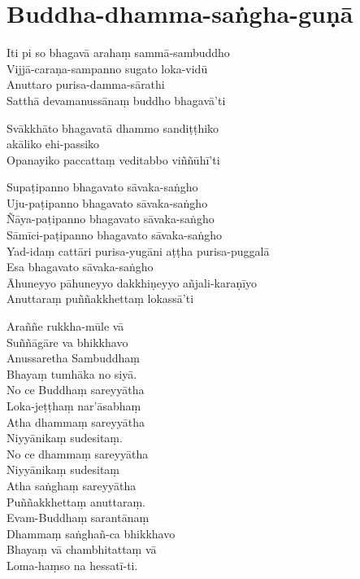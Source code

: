 \section{Buddha-dhamma-saṅgha-guṇā}


\begin{paritta}

Iti pi so bhagavā arahaṃ sammā-sambuddho\\
Vijjā-caraṇa-sampanno sugato loka-vidū\\
Anuttaro purisa-damma-sārathi\\
Satthā devamanussānaṃ buddho bhagavā'ti

Svākkhāto bhagavatā dhammo sandiṭṭhiko\\
\vin akāliko ehi-passiko\\
Opanayiko paccattaṃ veditabbo viññūhī'ti

Supaṭipanno bhagavato sāvaka-saṅgho\\
Uju-paṭipanno bhagavato sāvaka-saṅgho\\
Ñāya-paṭipanno bhagavato sāvaka-saṅgho\\
Sāmīci-paṭipanno bhagavato sāvaka-saṅgho\\
Yad-idaṃ cattāri purisa-yugāni aṭṭha purisa-puggalā\\
Esa bhagavato sāvaka-saṅgho\\
Āhuneyyo pāhuneyyo dakkhiṇeyyo añjali-karaṇīyo\\
Anuttaraṃ puññakkhettaṃ lokassā'ti


\sidepar{\pointerMark}%
Araññe rukkha-mūle vā\\
Suññāgāre va bhikkhavo\\
Anussaretha Sambuddhaṃ\\
Bhayaṃ tumhāka no siyā.\\
No ce Buddhaṃ sareyyātha\\
Loka-jeṭṭhaṃ nar'āsabhaṃ\\
Atha dhammaṃ sareyyātha\\
Niyyānikaṃ sudesitaṃ.\\
No ce dhammaṃ sareyyātha\\
Niyyānikaṃ sudesitaṃ\\
Atha saṅghaṃ sareyyātha\\
Puññakkhettaṃ anuttaraṃ.\\
Evam-Buddhaṃ sarantānaṃ\\
Dhammaṃ saṅghañ-ca bhikkhavo\\
Bhayaṃ vā chambhitattaṃ vā\\
Loma-haṃso na hessatī-ti.


\end{paritta}

